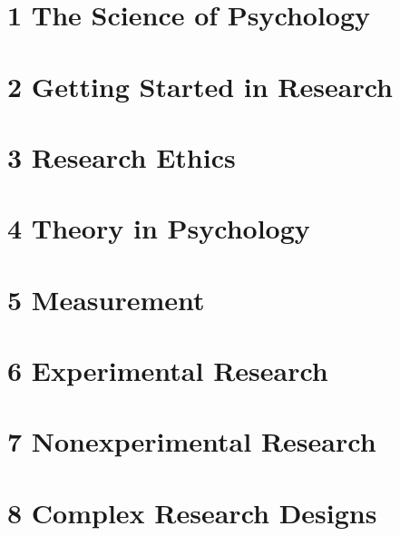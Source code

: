 \documentclass[oneside]{tufte-book}
\begin{document}
%


%

\chapter{1 The Science of Psychology}


\chapter{2 Getting Started in Research}


\chapter{3 Research Ethics}


\chapter{4 Theory in Psychology}


\chapter{5 Measurement}


\chapter{6 Experimental Research}


\chapter{7 Nonexperimental Research}


\chapter{8 Complex Research Designs}

\end{document}
